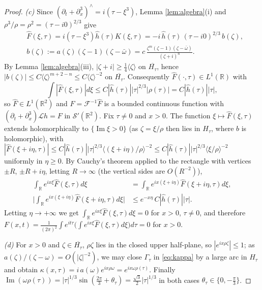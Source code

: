 \documentclass[10pt,reqno]{amsart}
\theoremstyle{remark}
\numberwithin{equation}{section}
\newcommand{\R}{\mathbb R}
\newcommand{\om}{\omega}
\newcommand{\pd}{\partial}
\newcommand{\ima}{\operatorname{Im}}
\newcommand{\lan}{\langle}
\newcommand{\ran}{\rangle}
\newcommand{\Lc}{\mathcal{L}}
\newcommand{\F}{\mathcal{F}}
\begin{document}
\begin{proof}
\emph{(c)} Since $(\pd_t+\pd_x^3)^\wedge=i(\tau-\xi^3)$, Lemma \ref{lem:algebra}(i) and $\rho^3/\rho=\rho^2=(\tau-i0)^{2/3}$ give
\begin{equation}\label{eq:Fhat}
\begin{split}
&\widehat F(\xi,\tau)=i(\tau-\xi^3)\widehat h(\tau)K(\xi,\tau)=-i\,\widehat h(\tau)\,(\tau-i0)^{2/3}\,b(\zeta),\\& b(\zeta):=a(\zeta)(\zeta-1)(\zeta-\bar\om)=c\,\frac{\zeta^m(\zeta-1)(\zeta-\bar\om)}{(\zeta+i)^n}.
\end{split}
\end{equation}
By Lemma \ref{lem:algebra}(iii), $|\zeta+i|\ge\frac14\lan\zeta\ran$ on $\overline{H_\tau}$, hence $|b(\zeta)|\le C\lan\zeta\ran^{m+2-n}\le C\lan\zeta\ran^{-2}$ on $\overline{H_\tau}$. Consequently $\widehat F(\cdot,\tau)\in L^1(\R)$ with $$\int|\widehat F(\xi,\tau)|d\xi\le C|\widehat h(\tau)||\tau|^{2/3}|\rho(\tau)|=C|\widehat h(\tau)||\tau|,$$ so $\widehat F\in L^1(\R^2)$ and $F=\F^{-1}\widehat F$ is a bounded continuous function with $(\pd_t+\pd_x^3)\Lc h=F$ in $\mathcal S'(\R^2)$. Fix $\tau\ne0$ and $x>0$. The function $\xi\mapsto\widehat F(\xi,\tau)$ extends holomorphically to $\{\ima\xi>0\}$ (as $\zeta=\xi/\rho$ then lies in $H_\tau$, where $b$ is holomorphic), with $|\widehat F(\xi+i\eta,\tau)|\le C|\widehat h(\tau)||\tau|^{2/3}\lan(\xi+i\eta)/\rho\ran^{-2}\le C|\widehat h(\tau)||\tau|^{2/3}\lan\xi/\rho\ran^{-2}$ uniformly in $\eta\ge0$. By Cauchy's theorem applied to the rectangle with vertices $\pm R$, $\pm R+i\eta$, letting $R\to\infty$ (the vertical sides are $O(R^{-2})$),
\begin{equation*}\begin{split}
\int_\R e^{ix\xi}\widehat F(\xi,\tau)d\xi&=\int_\R e^{ix(\xi+i\eta)}\widehat F(\xi+i\eta,\tau)d\xi,\\
\Big|\int_\R e^{ix(\xi+i\eta)}\widehat F(\xi+i\eta,\tau)d\xi\Big|&\le e^{-x\eta}\,C|\widehat h(\tau)||\tau| .
\end{split}\end{equation*}
Letting $\eta\to+\infty$ we get $\int_\R e^{ix\xi}\widehat F(\xi,\tau)d\xi=0$ for $x>0$, $\tau\ne0$, and therefore $F(x,t)=\frac1{(2\pi)^2}\int e^{it\tau}\big(\int e^{ix\xi}\widehat F(\xi,\tau)d\xi\big)d\tau=0$ for $x>0$.

\emph{(d)} For $x>0$ and $\zeta\in\overline{H_\tau}$, $\rho\zeta$ lies in the closed upper half-plane, so $|e^{ix\rho\zeta}|\le1$; as $a(\zeta)/(\zeta-\om)=O(|\zeta|^{-2})$, we may close $\Gamma_\tau$ in \eqref{eq:kappa} by a large arc in $H_\tau$ and obtain $\kappa(x,\tau)=i\,a(\om)e^{ix\rho\om}=e^{ix\om\rho(\tau)}$. Finally $\ima(\om\rho(\tau))=|\tau|^{1/3}\sin(\frac{2\pi}3+\theta_\tau)=\frac{\sqrt3}2|\tau|^{1/3}$ in both cases $\theta_\tau\in\{0,-\frac\pi3\}$.


\end{proof}
\end{document}
